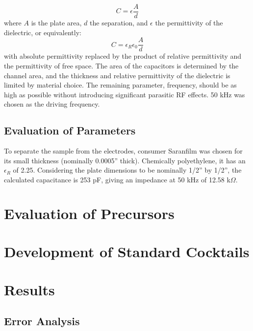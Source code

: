\documentclass[]{article}
\begin{document}
 \begin{equation}
 C=\epsilon\frac{A}{d}
 \end{equation}
 where $A$ is the plate area, $d$ the separation, and $\epsilon$ the permittivity of the dielectric, or equivalently:
 \begin{equation}
 C=\epsilon_R\epsilon_0\frac{A}{d}
 \end{equation}
with absolute permittivity replaced by the product of relative permittivity and the permittivity of free space.
The area of the capacitors is determined by the channel area, and the thickness and relative permittivity of the dielectric is limited by material choice. The remaining parameter, frequency, should be as high as possible without introducing significant parasitic RF effects. 50 kHz was chosen as the driving frequency.
\subsection{Evaluation of Parameters}
\par To separate the sample from the electrodes, consumer Saran\textregistered film was chosen for its small thickness (nominally 0.0005'' thick). Chemically polyethylene, it has an $\epsilon_R$ of 2.25. Considering the plate dimensions to be nominally 1/2'' by 1/2'', the calculated capacitance is 253 pF, giving an impedance at 50 kHz of 12.58 k$\Omega$.
\section{Evaluation of Precursors}
\section{Development of Standard Cocktails}
\section{Results}
\subsection{Error Analysis}
\label{sec:error}
\end{document}
